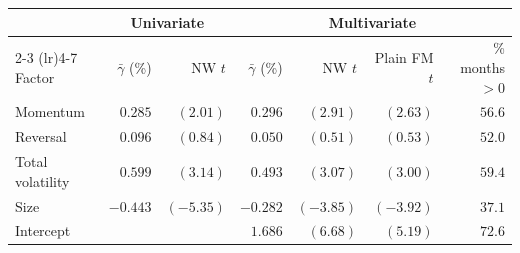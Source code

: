 \begin{tabular}{lrrrrrr}
\toprule
& \multicolumn{2}{c}{Univariate} & \multicolumn{4}{c}{Multivariate} \\
\cmidrule(lr){2-3} \cmidrule(lr){4-7}
Factor & $\bar\gamma$ (\%) & NW $t$ & $\bar\gamma$ (\%) & NW $t$ & Plain FM $t$ & \% months $>0$ \\
\midrule
Momentum & $0.285$ & $(2.01)$ & $0.296$ & $(2.91)$ & $(2.63)$ & $56.6$ \\
Reversal & $0.096$ & $(0.84)$ & $0.050$ & $(0.51)$ & $(0.53)$ & $52.0$ \\
Total volatility & $0.599$ & $(3.14)$ & $0.493$ & $(3.07)$ & $(3.00)$ & $59.4$ \\
Size & $-0.443$ & $(-5.35)$ & $-0.282$ & $(-3.85)$ & $(-3.92)$ & $37.1$ \\
Intercept &  &  & $1.686$ & $(6.68)$ & $(5.19)$ & $72.6$ \\
\bottomrule
\end{tabular}
